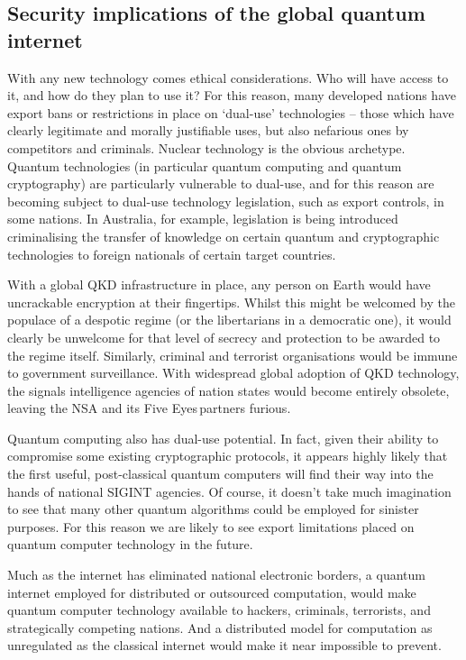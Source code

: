 %
%

\subsection{Security implications of the global quantum internet} \label{sec:sec_imp} 

With any new technology comes ethical considerations. Who will have access to it, and how do they plan to use it? For this reason, many developed nations have export bans or restrictions in place on `dual-use' technologies -- those which have clearly legitimate and morally justifiable uses, but also nefarious ones by competitors and criminals. Nuclear technology is the obvious archetype. Quantum technologies (in particular quantum computing and quantum cryptography) are particularly vulnerable to dual-use, and for this reason are becoming subject to dual-use technology legislation, such as export controls, in some nations. In Australia, for example, legislation is being introduced criminalising the transfer of knowledge on certain quantum and cryptographic technologies to foreign nationals of certain target countries.

With a global QKD infrastructure in place, any person on Earth would have uncrackable encryption at their fingertips. Whilst this might be welcomed by the populace of a despotic regime (or the libertarians in a democratic one), it would clearly be unwelcome for that level of secrecy and protection to be awarded to the regime itself. Similarly, criminal and terrorist organisations would be immune to government surveillance. With widespread global adoption of QKD technology, the signals intelligence agencies of nation states would become entirely obsolete, leaving the NSA and its Five Eyes\texttrademark\,partners furious.

Quantum computing also has dual-use potential. In fact, given their ability to compromise some existing cryptographic protocols, it appears highly likely that the first useful, post-classical quantum computers will find their way into the hands of national SIGINT agencies. Of course, it doesn't take much imagination to see that many other quantum algorithms could be employed for sinister purposes. For this reason we are likely to see export limitations placed on quantum computer technology in the future.

Much as the internet has eliminated national electronic borders, a quantum internet employed for distributed or outsourced computation, would make quantum computer technology available to hackers, criminals, terrorists, and strategically competing nations. And a distributed model for computation as unregulated as the classical internet would make it near impossible to prevent.


